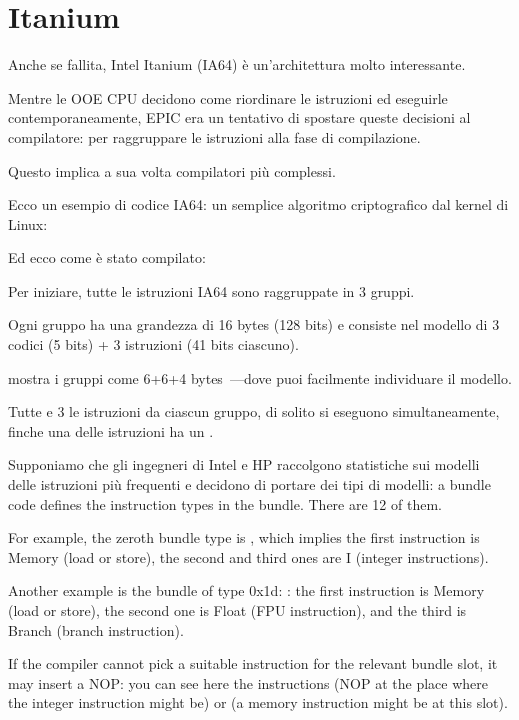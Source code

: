 \section{Itanium}
\label{itanium}

Anche se fallita, Intel Itanium (\ac{IA64}) è un'architettura molto interessante.

Mentre le \ac{OOE} CPU decidono come riordinare le istruzioni ed eseguirle contemporaneamente,
\ac{EPIC} era un tentativo di spostare queste decisioni al compilatore:
per raggruppare le istruzioni alla fase di compilazione.

Questo implica a sua volta compilatori più complessi.

Ecco un esempio di codice \ac{IA64}: un semplice algoritmo criptografico dal kernel di Linux:



Ed ecco come è stato compilato:



Per iniziare, tutte le istruzioni \ac{IA64} sono raggruppate in 3 gruppi.

Ogni gruppo ha una grandezza di 16 bytes (128 bits) e consiste nel modello di 3 codici (5 bits) + 3 istruzioni (41 bits ciascuno).

\IDA mostra i gruppi come 6+6+4 bytes~---dove puoi facilmente individuare il modello.

Tutte e 3 le istruzioni da ciascun gruppo, di solito si eseguono simultaneamente, finche una delle istruzioni ha un .

Supponiamo che gli ingegneri di Intel e HP raccolgono statistiche sui modelli delle istruzioni più frequenti e decidono di portare
dei tipi di modelli: a bundle code defines the instruction types in the bundle.
There are 12 of them.

For example, the zeroth bundle type is , which implies 
the first instruction is Memory (load or store), the second and third ones are I (integer instructions).

Another example is the bundle of type 0x1d: :
the first instruction is Memory (load or store), the second one is Float 
(\ac{FPU} instruction), and the third is Branch (branch instruction).

If the compiler cannot pick a suitable instruction for the relevant bundle slot, it may insert a \ac{NOP}:
you can see here the
 instructions (\ac{NOP} at the place where the integer instruction might be) or  
(a memory instruction might be at this slot).

